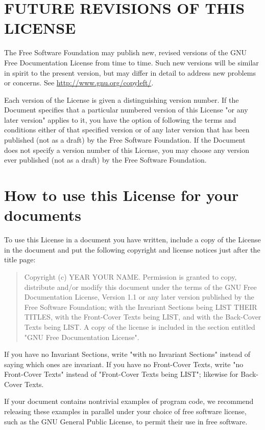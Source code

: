 \section{FUTURE REVISIONS OF THIS LICENSE}\label{gfdl-10}

The Free Software Foundation may publish new, revised versions of the
GNU Free Documentation License from time to time. Such new versions will
be similar in spirit to the present version, but may differ in detail to
address new problems or concerns. See
\url{http://www.gnu.org/copyleft/}.

Each version of the License is given a distinguishing version number. If
the Document specifies that a particular numbered version of this
License "or any later version" applies to it, you have the option of
following the terms and conditions either of that specified version or
of any later version that has been published (not as a draft) by the
Free Software Foundation. If the Document does not specify a version
number of this License, you may choose any version ever published (not
as a draft) by the Free Software Foundation.

\section{How to use this License for your documents}\label{gfdl-11}

To use this License in a document you have written, include a copy of
the License in the document and put the following copyright and license
notices just after the title page:

\begin{quote}
Copyright (c) YEAR YOUR NAME. Permission is granted to copy, distribute
and/or modify this document under the terms of the GNU Free
Documentation License, Version 1.1 or any later version published by the
Free Software Foundation; with the Invariant Sections being LIST THEIR
TITLES, with the Front-Cover Texts being LIST, and with the Back-Cover
Texts being LIST. A copy of the license is included in the section
entitled "GNU Free Documentation License".
\end{quote}

If you have no Invariant Sections, write "with no Invariant Sections"
instead of saying which ones are invariant. If you have no Front-Cover
Texts, write "no Front-Cover Texts" instead of "Front-Cover Texts being
LIST"; likewise for Back-Cover Texts.

If your document contains nontrivial examples of program code, we
recommend releasing these examples in parallel under your choice of free
software license, such as the GNU General Public License, to permit
their use in free software.

